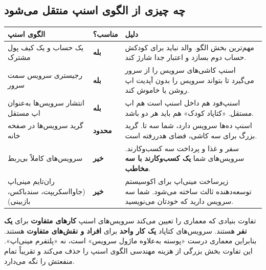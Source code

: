 \documentclass[11pt,a4paper]{article}
\begin{document}
\subsection{چه چیزی از الگوی اسنپ منتقل می‌شود}
\begin{longtable}{@{}F{4.6cm} N{1.9cm} N{9.2cm}@{}}
\toprule
\textbf{الگوی اسنپ} & \textbf{مناسب؟} & \textbf{دلیل} \\
\midrule
\endhead
یک حساب و یک کیف پول مشترک & \textcolor{mob}{\textbf{بله}} & مهم‌ترین بخش الگو. والد نباید برای کودکش حساب دوم بسازد و اعتبار جدا شارژ کند. \\
رجیستری سرویس سمت سرور & \textcolor{mob}{\textbf{بله}} & اسنپ کاشی‌های سرویس را از سرور می‌گیرد تا بتواند سرویس را بدون آپدیت اپ روشن یا خاموش کند. \\
انتشار سرویس‌ها به‌عنوان اپ مستقل & \textcolor{mob}{\textbf{بله}} & اسنپ‌فود هم داخل اسنپ است هم اپ مستقل. «کتاپاد کودک» هم باید هر دو باشد. \\
گرید سرویس‌ها در صفحه خانه & \textcolor{kid}{\textbf{محدود}} & اسنپ ده‌ها سرویس دارد، شما سه تا. گرید بزرگ برای سه کاشی، فضای هدررفته است. \\
سرویس‌های کاملاً بی‌ربط & \textcolor{warn}{\textbf{خیر}} & سفر و غذا و پرداخت سه کسب‌وکارند. سرویس‌های شما \textbf{یک کسب‌وکارند با سه مخاطب}. \\
ران‌تایم مینی‌اپ (جاوااسکریپت، سندباکس، بازبینی) & \textcolor{warn}{\textbf{خیر}} & زیرساخت مینی‌اپ برای اکوسیستم توسعه‌دهنده ثالث ساخته می‌شود. شما سه سرویس دارید که خودتان می‌نویسید. \\
\bottomrule
\end{longtable}

\begin{notebox}{تفاوت بنیادی که معماری را تعیین می‌کند}
سرویس‌های اسنپ \textbf{کارهای متفاوت} برای \textbf{یک نفر} هستند. سرویس‌های کتاپاد
\textbf{یک کار واحد} برای \textbf{افراد و نقش‌های متفاوت} هستند. بنابراین معماری درست
«پوسته به‌علاوه ماژول سرویس» است، نه «پلتفرم مینی‌اپ». این تفاوت بخش بزرگی از هزینه مهندسی
الگوی اسنپ را حذف می‌کند و تقریباً تمام منفعتش را نگه می‌دارد.
\end{notebox}
\end{document}
